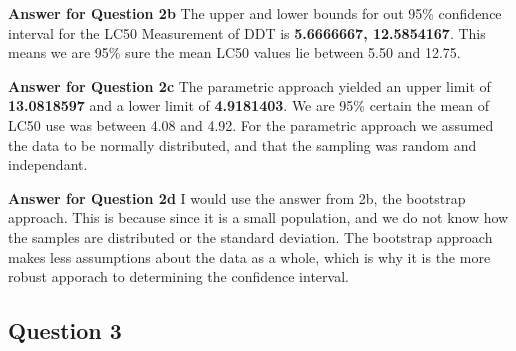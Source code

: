 \documentclass[
]{article}
\newenvironment{Shaded}{\begin{snugshade}}{\end{snugshade}}
\newcommand{\DecValTok}[1]{\textcolor[rgb]{0.00,0.00,0.81}{#1}}
\newcommand{\FloatTok}[1]{\textcolor[rgb]{0.00,0.00,0.81}{#1}}
\newcommand{\FunctionTok}[1]{\textcolor[rgb]{0.00,0.00,0.00}{#1}}
\newcommand{\NormalTok}[1]{#1}
\newcommand{\OtherTok}[1]{\textcolor[rgb]{0.56,0.35,0.01}{#1}}
\newcommand{\SpecialCharTok}[1]{\textcolor[rgb]{0.00,0.00,0.00}{#1}}
\begin{document}
\begin{Shaded}
\end{Shaded}

\textbf{Answer for Question 2b} The upper and lower bounds for out 95\%
confidence interval for the LC50 Measurement of DDT is
\textbf{5.6666667, 12.5854167}. This means we are 95\% sure the mean
LC50 values lie between 5.50 and 12.75.

\textbf{Answer for Question 2c} The parametric approach yielded an upper
limit of \textbf{13.0818597} and a lower limit of \textbf{4.9181403}. We
are 95\% certain the mean of LC50 use was between 4.08 and 4.92. For the
parametric approach we assumed the data to be normally distributed, and
that the sampling was random and independant.

\textbf{Answer for Question 2d} I would use the answer from 2b, the
bootstrap approach. This is because since it is a small population, and
we do not know how the samples are distributed or the standard
deviation. The bootstrap approach makes less assumptions about the data
as a whole, which is why it is the more robust apporach to determining
the confidence interval.

\hypertarget{question-3}{%
\subsection{Question 3}\label{question-3}}
\end{document}
